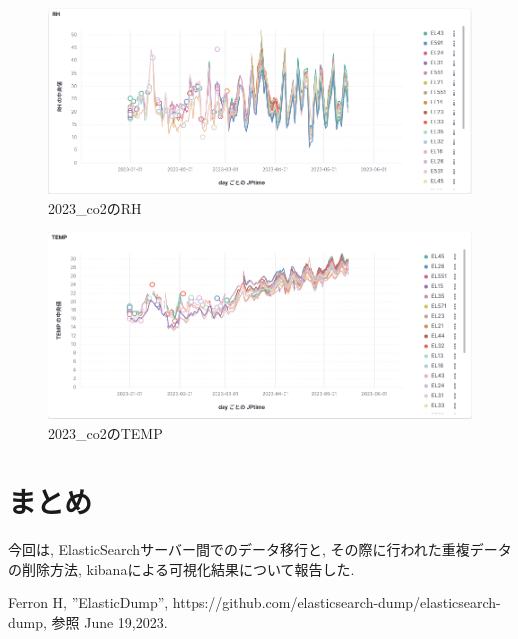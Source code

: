 \documentclass[a4j,12pt,]{jarticle}
\begin{document}
\begin{figure}[H]
  \begin{center}
    \includegraphics[width=160mm]{2023_rh.png}
    \caption{2023\_co2のRH}
    \label{p5}
  \end{center}
\end{figure}

\begin{figure}[H]
  \begin{center}
    \includegraphics[width=160mm]{2023_temp.png}
    \caption{2023\_co2のTEMP}
    \label{p6}
  \end{center}
\end{figure}

\section{まとめ}
今回は, ElasticSearchサーバー間でのデータ移行と, その際に行われた重複データの削除方法, kibanaによる可視化結果について報告した.

\begin{thebibliography}{5}
  Ferron H, ”ElasticDump”, https://github.com/elasticsearch-dump/elasticsearch-dump, 参照 June 19,2023.
\end{thebibliography}
\end{document}
